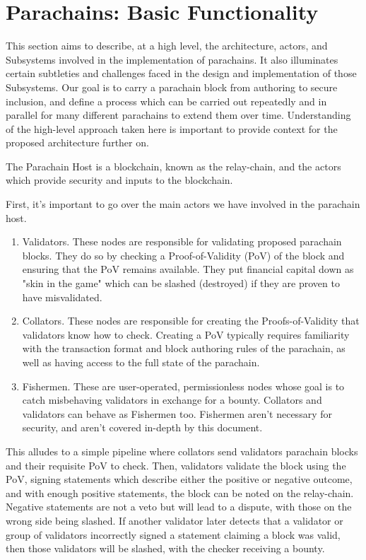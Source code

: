 \section{Parachains: Basic Functionality}

This section aims to describe, at a high level, the architecture, actors, and Subsystems involved in the implementation of parachains. It also illuminates certain subtleties and challenges faced in the design and implementation of those Subsystems. Our goal is to carry a parachain block from authoring to secure inclusion, and define a process which can be carried out repeatedly and in parallel for many different parachains to extend them over time. Understanding of the high-level approach taken here is important to provide context for the proposed architecture further on.

The Parachain Host is a blockchain, known as the relay-chain, and the actors which provide security and inputs to the blockchain.

First, it's important to go over the main actors we have involved in the parachain host.

\begin{enumerate}
    \item Validators. These nodes are responsible for validating proposed parachain blocks. They do so by checking a Proof-of-Validity (PoV) of the block and ensuring that the PoV remains available. They put financial capital down as "skin in the game" which can be slashed (destroyed) if they are proven to have misvalidated.
    \item Collators. These nodes are responsible for creating the Proofs-of-Validity that validators know how to check. Creating a PoV typically requires familiarity with the transaction format and block authoring rules of the parachain, as well as having access to the full state of the parachain.
    \item Fishermen. These are user-operated, permissionless nodes whose goal is to catch misbehaving validators in exchange for a bounty. Collators and validators can behave as Fishermen too. Fishermen aren't necessary for security, and aren't covered in-depth by this document.
\end{enumerate}

This alludes to a simple pipeline where collators send validators parachain blocks and their requisite PoV to check. Then, validators validate the block using the PoV, signing statements which describe either the positive or negative outcome, and with enough positive statements, the block can be noted on the relay-chain. Negative statements are not a veto but will lead to a dispute, with those on the wrong side being slashed. If another validator later detects that a validator or group of validators incorrectly signed a statement claiming a block was valid, then those validators will be slashed, with the checker receiving a bounty.

